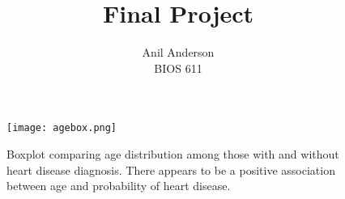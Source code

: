 \documentclass[12pt]{article}
\begin{document}
 
\title{Final Project}
\author{Anil Anderson\\
BIOS 611}
 
\maketitle

\begin{figure}[htbp]
\centering
\texttt{[image: agebox.png]}
\caption{Boxplot comparing age distribution among those with and without heart disease diagnosis. There appears to be a positive association between age and probability of heart disease.}
\end{figure}
\end{document}
